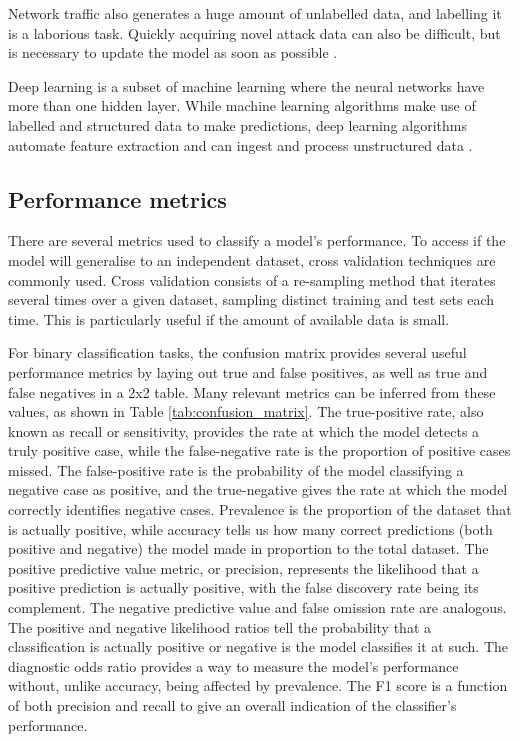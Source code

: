 Network traffic also generates a huge amount of unlabelled data, and labelling it is a laborious task. Quickly acquiring novel attack data can also be difficult, but is necessary to update the model as soon as possible \citep{Buczak2016}.\par

Deep learning is a subset of machine learning where the neural networks have more than one hidden layer. While machine learning algorithms make use of labelled and structured data to make predictions, deep learning algorithms automate feature extraction and can ingest and process unstructured data \citep{ibmDeepLearning}.

\subsection{Performance metrics}

There are several metrics used to classify a model's performance. To access if the model will generalise to an independent dataset, cross validation techniques are commonly used. Cross validation consists of a re-sampling method that iterates several times over a given dataset, sampling distinct training and test sets each time. This is particularly useful if the amount of available data is small.\par

For binary classification tasks, the confusion matrix provides several useful performance metrics by laying out true and false positives, as well as true and false negatives in a 2x2 table. Many relevant metrics can be inferred from these values, as shown in Table \ref{tab:confusion_matrix}. The true-positive rate, also known as recall or sensitivity, provides the rate at which the model detects a truly positive case, while the false-negative rate is the proportion of positive cases missed. The false-positive rate is the probability of the model classifying a negative case as positive, and the true-negative gives the rate at which the model correctly identifies negative cases. Prevalence is the proportion of the dataset that is actually positive, while accuracy tells us how many correct predictions (both positive and negative) the model made in proportion to the total dataset. The positive predictive value metric, or precision, represents the likelihood that a positive prediction is actually positive, with the false discovery rate being its complement. The negative predictive value and false omission rate are analogous. The positive and negative likelihood ratios tell the probability that a classification is actually positive or negative is the model classifies it at such. The diagnostic odds ratio provides a way to measure the model's performance without, unlike accuracy, being affected by prevalence. The F1 score is a function of both precision and recall to give an overall indication of the classifier's performance.


